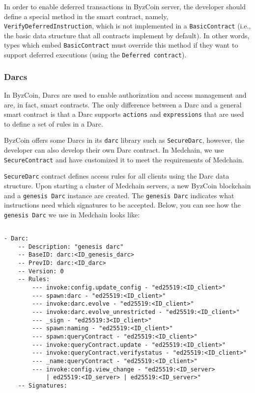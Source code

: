 In order to enable deferred transactions in ByzCoin server, the developer should define a special method in the smart contract, namely, \texttt{VerifyDeferredInstruction}, which is not implemented in a \texttt{BasicContract} (i.e., the basic data structure that all contracts implement by default). In other words, types which embed \texttt{BasicContract} must override this method if they want to support deferred executions (using the \texttt{Deferred contract}). 

\subsubsection{Darcs} \label{impl:darcs}
In ByzCoin, Darcs are used to enable authorization and access management and are, in fact, smart contracts. The only difference between a Darc and a general smart contract is that a Darc supports \texttt{actions} and \texttt{expressions} that are used to define a set of rules in a Darc.

ByzCoin offers some Darcs in its \texttt{darc} library such as \texttt{SecureDarc}, however, the developer can also develop their own Darc contract. In Medchain, we use \texttt{SecureContract} and have customized it to meet the requirements of Medchain. 

\texttt{SecureDarc} contract defines access rules for all clients using the Darc data structure. Upon starting a cluster of Medchain servers, a new ByzCoin blockchain and a \texttt{genesis Darc} instance are created. The \texttt{genesis Darc} indicates what instructions need which signatures to be accepted. Below, you can see how the \texttt{genesis Darc} we use in Medchain looks like:

\begin{verbatim}

- Darc:
    -- Description: "genesis darc"
    -- BaseID: darc:<ID_genesis_darc>
    -- PrevID: darc:<ID_darc>
    -- Version: 0
    -- Rules:
        --- invoke:config.update_config - "ed25519:<ID_client>"
        --- spawn:darc - "ed25519:<ID_client>"
        --- invoke:darc.evolve - "ed25519:<ID_client>"
        --- invoke:darc.evolve_unrestricted - "ed25519:<ID_client>"
        --- _sign - "ed25519:3<ID_client>"
        --- spawn:naming - "ed25519:<ID_client>"
        --- spawn:queryContract - "ed25519:<ID_client>"
        --- invoke:queryContract.update - "ed25519:<ID_client>"
        --- invoke:queryContract.verifystatus - "ed25519:<ID_client>"
        --- _name:queryContract - "ed25519:<ID_client>"
        --- invoke:config.view_change - "ed25519:<ID_server> 
            | ed25519:<ID_server> | ed25519:<ID_server>"
    -- Signatures:
    
\end{verbatim}


